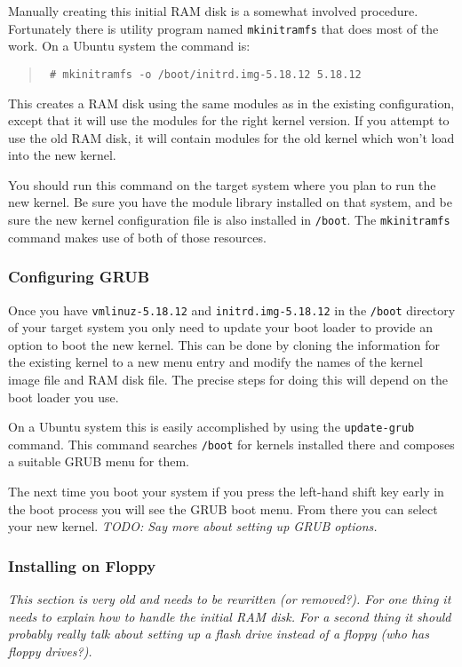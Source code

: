 \documentclass{article}
\newcommand{\command}[1]{\texttt{#1}}
\newcommand{\filename}[1]{\texttt{#1}}
\newcommand{\todo}[1]{\textit{TODO: #1}}
\newenvironment{commands}
  {\begin{quote} \tt}
  {\end{quote}}
\begin{document}
Manually creating this initial RAM disk is a somewhat involved procedure. Fortunately there is
utility program named \command{mkinitramfs} that does most of the work. On a Ubuntu system the
command is:
\begin{commands}
  \# mkinitramfs -o /boot/initrd.img-5.18.12 5.18.12
\end{commands}

This creates a RAM disk using the same modules as in the existing configuration, except that it
will use the modules for the right kernel version. If you attempt to use the old RAM disk, it
will contain modules for the old kernel which won't load into the new kernel.

You should run this command on the target system where you plan to run the new kernel. Be sure
you have the module library installed on that system, and be sure the new kernel configuration
file is also installed in \filename{/boot}. The \command{mkinitramfs} command makes use of both
of those resources.

\subsubsection{Configuring GRUB}

Once you have \filename{vmlinuz-5.18.12} and \filename{initrd.img-5.18.12} in the
\filename{/boot} directory of your target system you only need to update your boot loader to
provide an option to boot the new kernel. This can be done by cloning the information for the
existing kernel to a new menu entry and modify the names of the kernel image file and RAM disk
file. The precise steps for doing this will depend on the boot loader you use.

On a Ubuntu system this is easily accomplished by using the \command{update-grub} command. This
command searches \filename{/boot} for kernels installed there and composes a suitable GRUB menu
for them.

The next time you boot your system if you press the left-hand shift key early in the boot
process you will see the GRUB boot menu. From there you can select your new kernel. \todo{Say
  more about setting up GRUB options.}

\subsubsection{Installing on Floppy}

\textit{This section is very old and needs to be rewritten (or removed?). For one thing it needs
  to explain how to handle the initial RAM disk. For a second thing it should probably really
  talk about setting up a flash drive instead of a floppy (who has floppy drives?).}
\end{document}
